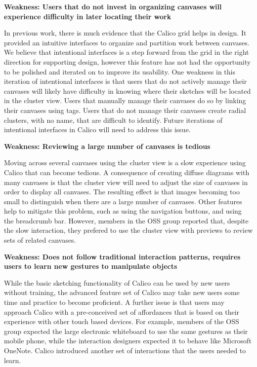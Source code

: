 

\textbf{Weakness: Users that do not invest in organizing canvases will experience difficulty in later locating their work}

In previous work, there is much evidence that the Calico grid helps in design. It provided an intuitive interfaces to organize and partition work between canvases. We believe that  intentional interfaces is a step forward from the grid in the right direction for supporting design, however this feature has not had the opportunity to be polished and iterated on to improve its usability. One weakness in this iteration of intentional interfaces is that users that do not actively manage their canvases will likely have difficulty in knowing where their sketches will be located in the cluster view. Users that manually manage their canvases do so by linking their canvases using tags. Users that do not manage their canvases create radial clusters, with no name, that are difficult to identify. Future iterations of intentional interfaces in Calico will need to address this issue.

\textbf{Weakness: Reviewing a large number of canvases is tedious}

Moving across several canvases using the cluster view is a slow experience using Calico that can become tedious. A consequence of creating diffuse diagrams with many canvases is that the cluster view will need to adjust the size of canvases in order to display all canvases. The resulting effect is that images becoming too small to distinguish when there are a large number of canvases. Other features help to mitigate this problem, such as using the navigation buttons, and using the breadcrumb bar. However, members in the OSS group reported that, despite the slow interaction, they prefered to use the cluster view with previews to review sets of related canvases.


\textbf{Weakness: Does not follow traditional interaction patterns, requires users to learn new gestures to manipulate objects}

While the basic sketching functionality of Calico can be used by new users without training, the advanced feature set of Calico may take new users some time and practice to become proficient. A further issue is that users may approach Calico with a pre-conceived set of affordances that is based on their experience with other touch based devices. For example, members of the OSS group expected the large electronic whiteboard to use the same gestures as their mobile phone, while the interaction designers expected it to behave like Microsoft OneNote. Calico introduced another set of interactions that the users needed to learn. 

